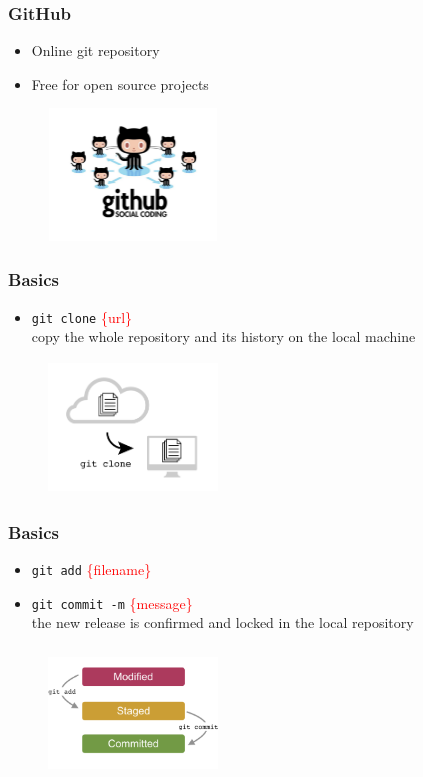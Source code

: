 \documentclass{beamer}
\begin{document}
\begin{frame}
\frametitle{GitHub}
\begin{itemize}
\item Online git repository
\item Free for open source projects
\end{itemize}
\begin{figure}
\centering
\includegraphics[height=3.5cm, width=4.5cm]{github_logo}
\end{figure}
\end{frame}

\begin{frame}[fragile]
\frametitle{Basics}
\begin{itemize}
\item \verb!git clone! \textcolor{red}{\{url\}} \\ 
copy the whole repository and its history on the local machine
\end{itemize}
\begin{figure}
\centering
\includegraphics[height=3.5cm, width=4.5cm]{clone}
\end{figure}
\end{frame}

\begin{frame}[fragile]
\frametitle{Basics}
\begin{itemize}
\item \verb!git add! \textcolor{red}{\{filename\}} \\ 
\item \verb!git commit -m! \textcolor{red}{\{message\}} \\ 
the new release is confirmed and locked in the local repository
\end{itemize}
\begin{figure}
\centering
\includegraphics[height=3.5cm, width=4.5cm]{commit}
\end{figure}
\end{frame}
\end{document}
